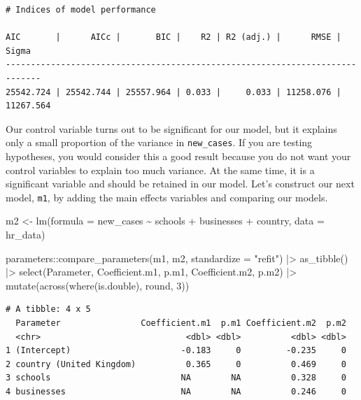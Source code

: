 \documentclass[
  letterpaper,
]{krantz}
\makeatletter
\newenvironment{Shaded}{\begin{snugshade}}{\end{snugshade}}
\newcommand{\AttributeTok}[1]{\textcolor[rgb]{0.40,0.45,0.13}{#1}}
\newcommand{\DecValTok}[1]{\textcolor[rgb]{0.68,0.00,0.00}{#1}}
\newcommand{\FunctionTok}[1]{\textcolor[rgb]{0.28,0.35,0.67}{#1}}
\newcommand{\NormalTok}[1]{\textcolor[rgb]{0.00,0.23,0.31}{#1}}
\newcommand{\OtherTok}[1]{\textcolor[rgb]{0.00,0.23,0.31}{#1}}
\newcommand{\SpecialCharTok}[1]{\textcolor[rgb]{0.37,0.37,0.37}{#1}}
\newcommand{\StringTok}[1]{\textcolor[rgb]{0.13,0.47,0.30}{#1}}
\newenvironment{kframe}{%
\medskip{}
\setlength{\fboxsep}{.8em}
 \def\at@end@of@kframe{}%
 \ifinner\ifhmode%
  \def\at@end@of@kframe{\end{minipage}}%
  \begin{minipage}{\columnwidth}%
 \fi\fi%
 \def\FrameCommand##1{\hskip\@totalleftmargin \hskip-\fboxsep
 \colorbox{shadecolor}{##1}\hskip-\fboxsep
     \hskip-\linewidth \hskip-\@totalleftmargin \hskip\columnwidth}%
 \MakeFramed {\advance\hsize-\width
   \@totalleftmargin\z@ \linewidth\hsize
   \@setminipage}}%
 {\par\unskip\endMakeFramed%
 \at@end@of@kframe}
\renewenvironment{Shaded}{\begin{kframe}}{\end{kframe}}
\makeatother
\begin{document}
\begin{verbatim}
# Indices of model performance

AIC       |      AICc |       BIC |    R2 | R2 (adj.) |      RMSE |     Sigma
-----------------------------------------------------------------------------
25542.724 | 25542.744 | 25557.964 | 0.033 |     0.033 | 11258.076 | 11267.564
\end{verbatim}

Our control variable turns out to be significant for our model, but it
explains only a small proportion of the variance in \texttt{new\_cases}.
If you are testing hypotheses, you would consider this a good result
because you do not want your control variables to explain too much
variance. At the same time, it is a significant variable and should be
retained in our model. Let's construct our next model, \texttt{m1}, by
adding the main effects variables and comparing our models.

\begin{Shaded}
\begin{Highlighting}[]
\NormalTok{m2 }\OtherTok{\textless{}{-}} \FunctionTok{lm}\NormalTok{(}\AttributeTok{formula =}\NormalTok{ new\_cases }\SpecialCharTok{\textasciitilde{}}
\NormalTok{           schools }\SpecialCharTok{+}
\NormalTok{           businesses }\SpecialCharTok{+}
\NormalTok{           country,}
         \AttributeTok{data =}\NormalTok{ hr\_data)}

\NormalTok{parameters}\SpecialCharTok{::}\FunctionTok{compare\_parameters}\NormalTok{(m1, m2, }\AttributeTok{standardize =} \StringTok{"refit"}\NormalTok{) }\SpecialCharTok{|\textgreater{}}
  \FunctionTok{as\_tibble}\NormalTok{() }\SpecialCharTok{|\textgreater{}}
  \FunctionTok{select}\NormalTok{(Parameter, Coefficient.m1, p.m1, Coefficient.m2, p.m2) }\SpecialCharTok{|\textgreater{}}
  \FunctionTok{mutate}\NormalTok{(}\FunctionTok{across}\NormalTok{(}\FunctionTok{where}\NormalTok{(is.double), round, }\DecValTok{3}\NormalTok{))}
\end{Highlighting}
\end{Shaded}

\begin{verbatim}
# A tibble: 4 x 5
  Parameter                Coefficient.m1  p.m1 Coefficient.m2  p.m2
  <chr>                             <dbl> <dbl>          <dbl> <dbl>
1 (Intercept)                      -0.183     0         -0.235     0
2 country (United Kingdom)          0.365     0          0.469     0
3 schools                          NA        NA          0.328     0
4 businesses                       NA        NA          0.246     0
\end{verbatim}
\end{document}
